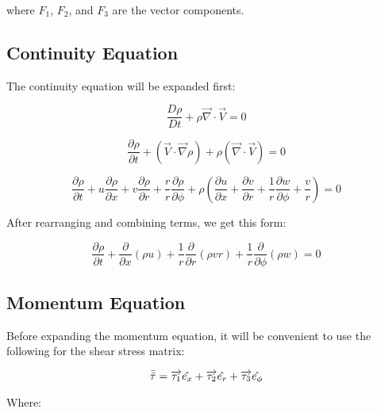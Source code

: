 where $F_1$, $F_2$, and $F_3$ are the vector components.

\subsection{Continuity Equation}

The continuity equation will be expanded first:

\begin{equation}
\frac{D\rho}{Dt} 
  + \rho \overrightarrow{\nabla}\cdot\overrightarrow{V} = 0
\end{equation}

\begin{equation}
  \frac{\partial\rho}{\partial t} 
  + \left(\overrightarrow{V}\cdot\overrightarrow{\nabla}\rho\right)
  + \rho\left(\overrightarrow{\nabla}\cdot\overrightarrow{V}\right) = 0
\end{equation}

\begin{equation}
  \frac{\partial\rho}{\partial t}  
  + u\frac{\partial\rho}{\partial x}
  + v\frac{\partial\rho}{\partial r} 
  + \frac{r}{r}\frac{\partial\rho}{\partial\phi}
  + \rho\left(\frac{\partial u}{\partial x}
  + \frac{\partial v}{\partial r} 
  + \frac{1}{r}\frac{\partial w}{\partial\phi} 
  + \frac{v}{r} \right) = 0
\end{equation}

After rearranging and combining terms, we get this form:

\begin{equation}
  \frac{\partial\rho}{\partial t}
  + \frac{\partial}{\partial x}\left(\rho u\right)
  + \frac{1}{r}\frac{\partial}{\partial r}\left(\rho v r \right)
  + \frac{1}{r}\frac{\partial}{\partial\phi}\left(\rho w\right) = 0
\end{equation}

\subsection{Momentum Equation}

Before expanding the momentum equation, it will be convenient to use the following for the shear stress matrix:

\begin{equation}
  \bar{\bar{\tau}} 
  = \overrightarrow{\tau_1}\hat{e_x} 
  + \overrightarrow{\tau_2}\hat{e_r}
  + \overrightarrow{\tau_3}\hat{e_\phi}
\end{equation}

Where:

